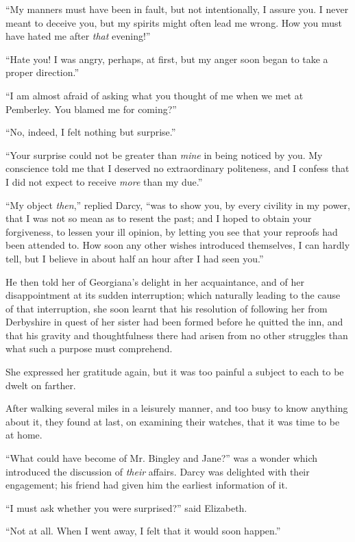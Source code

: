 \documentclass[12pt,openright]{book}
\begin{document}
“My manners must have been in fault, but not intentionally, I assure you. I never meant to deceive you, but my spirits might often lead me wrong. How you must have hated me after \textit{that} evening!”

“Hate you! I was angry, perhaps, at first, but my anger soon began to take a proper direction.”

“I am almost afraid of asking what you thought of me when we met at Pemberley. You blamed me for coming?”

“No, indeed, I felt nothing but surprise.”

“Your surprise could not be greater than \textit{mine} in being noticed by you. My conscience told me that I deserved no extraordinary politeness, and I confess that I did not expect to receive \textit{more} than my due.”

“My object \textit{then},” replied Darcy, “was to show you, by every civility in my power, that I was not so mean as to resent the past; and I hoped to obtain your forgiveness, to lessen your ill opinion, by letting you see that your reproofs had been attended to. How soon any other wishes introduced themselves, I can hardly tell, but I believe in about half an hour after I had seen you.”

He then told her of Georgiana’s delight in her acquaintance, and of her disappointment at its sudden interruption; which naturally leading to the cause of that interruption, she soon learnt that his resolution of following her from Derbyshire in quest of her sister had been formed before he quitted the inn, and that his gravity and thoughtfulness there had arisen from no other struggles than what such a purpose must comprehend.

She expressed her gratitude again, but it was too painful a subject to each to be dwelt on farther.

After walking several miles in a leisurely manner, and too busy to know anything about it, they found at last, on examining their watches, that it was time to be at home.

“What could have become of Mr. Bingley and Jane?” was a wonder which introduced the discussion of \textit{their} affairs. Darcy was delighted with their engagement; his friend had given him the earliest information of it.

“I must ask whether you were surprised?” said Elizabeth.

“Not at all. When I went away, I felt that it would soon happen.”
\end{document}
